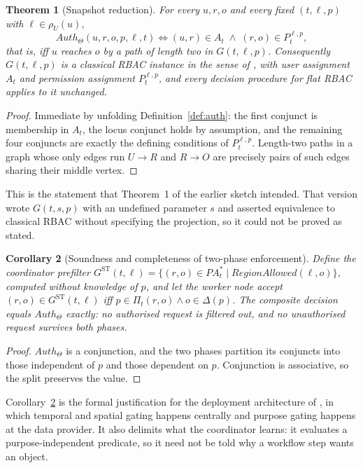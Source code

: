 \documentclass[11pt]{article}
\theoremstyle{definition}
\theoremstyle{plain}
\newtheorem{theorem}{Theorem}
\newtheorem{corollary}[theorem]{Corollary}
\theoremstyle{remark}
\newcommand{\Auth}{\mathit{Auth}}
\newcommand{\RegionOK}{\mathit{RegionAllowed}}
\begin{document}
\begin{theorem}[Snapshot reduction]
\label{thm:snapshot}
For every $u, r, o$ and every fixed $(t,\ell,p)$ with $\ell \in \rho_U(u)$,
\[
  \Auth_\Theta(u,r,o,p,\ell,t)
  \iff
  (u,r) \in A_t \;\land\; (r,o) \in P_t^{\ell,p},
\]
that is, iff $u$ reaches $o$ by a path of length two in $G(t,\ell,p)$.
Consequently $G(t,\ell,p)$ is a classical RBAC instance in the sense of
\citet{sandhu1996rbac}, with user assignment $A_t$ and permission assignment
$P_t^{\ell,p}$, and every decision procedure for flat RBAC applies to it
unchanged.
\end{theorem}

\begin{proof}
Immediate by unfolding Definition~\ref{def:auth}: the first conjunct is
membership in $A_t$, the locus conjunct holds by assumption, and the remaining
four conjuncts are exactly the defining conditions of $P_t^{\ell,p}$. Length-two
paths in a graph whose only edges run $U \to R$ and $R \to O$ are precisely
pairs of such edges sharing their middle vertex.
\end{proof}

This is the statement that Theorem~1 of the earlier sketch intended. That
version wrote $G(t,s,p)$ with an undefined parameter $s$ and asserted
equivalence to classical RBAC without specifying the projection, so it could not
be proved as stated.

\begin{corollary}[Soundness and completeness of two-phase enforcement]
\label{cor:split}
Define the coordinator prefilter
$G^{\mathrm{ST}}(t,\ell) = \{(r,o) \in PA^{*}_t \mid \RegionOK(\ell,o)\}$,
computed without knowledge of $p$, and let the worker node accept
$(r,o) \in G^{\mathrm{ST}}(t,\ell)$ iff
$p \in \Pi_t(r,o) \land o \in \Delta(p)$. The composite decision equals
$\Auth_\Theta$ exactly: no authorised request is filtered out, and no
unauthorised request survives both phases.
\end{corollary}

\begin{proof}
$\Auth_\Theta$ is a conjunction, and the two phases partition its conjuncts
into those independent of $p$ and those dependent on $p$. Conjunction is
associative, so the split preserves the value.
\end{proof}

Corollary~\ref{cor:split} is the formal justification for the deployment
architecture of \citet{kokash2026compliance}, in which temporal and spatial
gating happens centrally and purpose gating happens at the data provider. It
also delimits what the coordinator learns: it evaluates a purpose-independent
predicate, so it need not be told why a workflow step wants an object.
\end{document}
